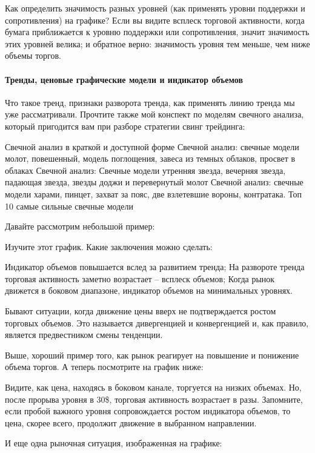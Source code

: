 \documentclass{book}
\begin{document}
Как определить значимость разных уровней (как применять уровни
поддержки и сопротивления) на графике? Если вы видите всплеск торговой
активности, когда бумага приближается к уровню поддержки или
сопротивления, значит значимость этих уровней велика; и обратное
верно: значимость уровня тем меньше, чем ниже объемы торгов.

\paragraph{Тренды, ценовые графические модели и индикатор объемов}

Что такое тренд, признаки разворота тренда, как применять линию тренда мы уже рассматривали. Прочтите также мой конспект по моделям свечного анализа, который пригодится вам при разборе стратегии свинг трейдинга:

    Свечной анализ в краткой и доступной форме
    Свечной анализ: свечные модели молот, повешенный, модель поглощения, завеса из темных облаков, просвет в облаках
    Свечной анализ: Свечные модели утренняя звезда, вечерняя звезда, падающая звезда, звезды доджи и перевернутый молот
    Свечной анализ: свечные модели харами, пинцет, захват за пояс, две взлетевшие вороны, контратака.
    Топ 10 самые сильные свечные модели

Давайте рассмотрим небольшой пример:

 Изучите этот график. Какие заключения можно сделать:

    Индикатор объемов повышается вслед за развитием тренда;
    На развороте тренда торговая активность заметно возрастает – всплеск объемов;
    Когда рынок движется в боковом диапазоне, индикатор объемов на минимальных уровнях.

Бывают ситуации, когда движение цены вверх не подтверждается ростом торговых объемов. Это называется дивергенцией и конвергенцией и, как правило, является предвестником смены тенденции.

Выше, хороший пример того, как рынок реагирует на повышение и понижение объема торгов. А теперь посмотрите на график ниже:

Видите, как цена, находясь в боковом канале, торгуется на низких объемах. Но, после прорыва уровня в 30\$, торговая активность возрастает в разы. Запомните, если пробой важного уровня сопровождается ростом индикатора объемов, то цена, скорее всего, продолжит движение в выбранном направлении.

И еще одна рыночная ситуация, изображенная на графике:
\end{document}

